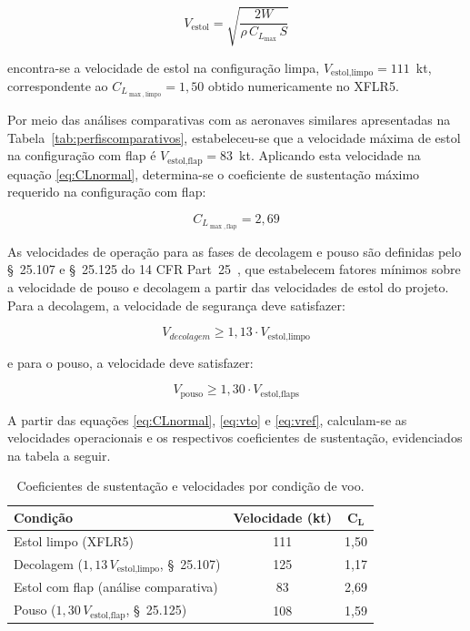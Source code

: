 \begin{equation}
    V_{\text{estol}} = \sqrt{\frac{2W}{\rho\, C_{L_{\max}}\, S}}
    \label{eq:Vestol}
\end{equation}

\noindent encontra-se a velocidade de estol na configuração limpa,
$V_{\text{estol,limpo}} = 111$~kt, correspondente ao $C_{L_{\max,\text{limpo}}} = 1{,}50$
obtido numericamente no XFLR5.

Por meio das análises comparativas com as aeronaves similares apresentadas na
Tabela~\ref{tab:perfiscomparativos}, estabeleceu-se que a velocidade máxima de
estol na configuração com flap é $V_{\text{estol,flap}} = 83$~kt. Aplicando
esta velocidade na equação \ref{eq:CLnormal}, determina-se o coeficiente de
sustentação máximo requerido na configuração com flap:

\begin{equation}
    C_{L_{\max,\text{flap}}} = 2{,}69
    \label{eq:CLmaxflap}
\end{equation}

As velocidades de operação para as fases de decolagem e pouso são definidas
pelo \S~25.107 e \S~25.125 do 14 CFR Part~25~\cite{far25}, que estabelecem
fatores mínimos sobre a velocidade de pouso e decolagem a partir das velocidades de estol do projeto. Para a decolagem, a velocidade de segurança deve satisfazer:

\begin{equation}
    V_{decolagem} \geq 1{,}13 \cdot V_{\text{estol,limpo}}
    \label{eq:vto}
\end{equation}

\noindent e para o pouso, a velocidade deve satisfazer:

\begin{equation}
    V_\text{pouso} \geq 1{,}30 \cdot V_{\text{estol,flaps}}
    \label{eq:vref}
\end{equation}

A partir das equações \ref{eq:CLnormal}, \ref{eq:vto} e \ref{eq:vref}, calculam-se
as velocidades operacionais e os respectivos coeficientes de sustentação, evidenciados na tabela a seguir.

\begin{table}[H]
    \centering
    \caption{Coeficientes de sustentação e velocidades por condição de voo.}
    \label{tab:clmax}
    \begin{tabular}{lcc}
        \toprule
        \textbf{Condição} & \textbf{Velocidade (kt)} & $\boldsymbol{C_L}$ \\
        \midrule
        Estol limpo  (XFLR5)                                       & 111 & 1,50 \\
        Decolagem ($1{,}13\,V_{\text{estol,limpo}}$, \S~25.107) & 125 & 1,17 \\
        Estol com flap (análise comparativa)                 &  83 & 2,69 \\
        Pouso ($1{,}30\,V_{\text{estol,flap}}$, \S~25.125)  & 108 & 1,59 \\
        \bottomrule
    \end{tabular}
\end{table}

